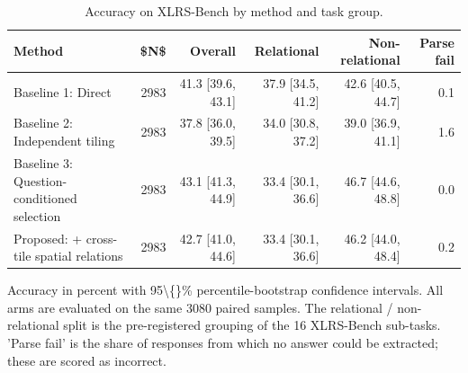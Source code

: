 \begin{table}[t]
\centering
\small
\begin{tabular}{lrrrrr}
\toprule
Method & \$N\$ & Overall & Relational & Non-relational & Parse fail \\
\midrule
Baseline 1: Direct & 2983 & 41.3 [39.6, 43.1] & 37.9 [34.5, 41.2] & 42.6 [40.5, 44.7] & 0.1 \\
Baseline 2: Independent tiling & 2983 & 37.8 [36.0, 39.5] & 34.0 [30.8, 37.2] & 39.0 [36.9, 41.1] & 1.6 \\
Baseline 3: Question-conditioned selection & 2983 & 43.1 [41.3, 44.9] & 33.4 [30.1, 36.6] & 46.7 [44.6, 48.8] & 0.0 \\
Proposed: + cross-tile spatial relations & 2983 & 42.7 [41.0, 44.6] & 33.4 [30.1, 36.6] & 46.2 [44.0, 48.4] & 0.2 \\
\bottomrule
\end{tabular}
\vspace{2pt}
\begin{minipage}{\linewidth}\footnotesize Accuracy in percent with 95\textbackslash\{\}\% percentile-bootstrap confidence intervals. All arms are evaluated on the same 3080 paired samples. The relational / non-relational split is the pre-registered grouping of the 16 XLRS-Bench sub-tasks. 'Parse fail' is the share of responses from which no answer could be extracted; these are scored as incorrect.\end{minipage}
\caption{Accuracy on XLRS-Bench by method and task group.}
\label{tab:main}
\end{table}
